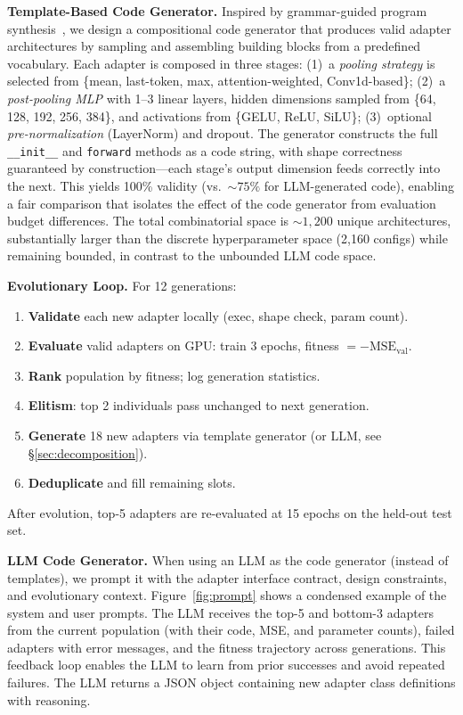 \documentclass{article}
\begin{document}
\textbf{Template-Based Code Generator.} Inspired by grammar-guided program synthesis~\cite{koza1994genetic, mckay2010grammar}, we design a compositional code generator that produces valid adapter architectures by sampling and assembling building blocks from a predefined vocabulary. Each adapter is composed in three stages: (1)~a \textit{pooling strategy} is selected from \{mean, last-token, max, attention-weighted, Conv1d-based\}; (2)~a \textit{post-pooling MLP} with 1--3 linear layers, hidden dimensions sampled from \{64, 128, 192, 256, 384\}, and activations from \{GELU, ReLU, SiLU\}; (3)~optional \textit{pre-normalization} (LayerNorm) and dropout. The generator constructs the full \texttt{\_\_init\_\_} and \texttt{forward} methods as a code string, with shape correctness guaranteed by construction---each stage's output dimension feeds correctly into the next. This yields 100\% validity (vs.\ ${\sim}75\%$ for LLM-generated code), enabling a fair comparison that isolates the effect of the code generator from evaluation budget differences. The total combinatorial space is ${\sim}1{,}200$ unique architectures, substantially larger than the discrete hyperparameter space (2,160 configs) while remaining bounded, in contrast to the unbounded LLM code space.

\textbf{Evolutionary Loop.} For 12 generations:
\begin{enumerate}
    \item \textbf{Validate} each new adapter locally (exec, shape check, param count).
    \item \textbf{Evaluate} valid adapters on GPU: train 3 epochs, fitness $= -\text{MSE}_\text{val}$.
    \item \textbf{Rank} population by fitness; log generation statistics.
    \item \textbf{Elitism}: top 2 individuals pass unchanged to next generation.
    \item \textbf{Generate} 18 new adapters via template generator (or LLM, see \S\ref{sec:decomposition}).
    \item \textbf{Deduplicate} and fill remaining slots.
\end{enumerate}
After evolution, top-5 adapters are re-evaluated at 15 epochs on the held-out test set.

\textbf{LLM Code Generator.} When using an LLM as the code generator (instead of templates), we prompt it with the adapter interface contract, design constraints, and evolutionary context. Figure~\ref{fig:prompt} shows a condensed example of the system and user prompts. The LLM receives the top-5 and bottom-3 adapters from the current population (with their code, MSE, and parameter counts), failed adapters with error messages, and the fitness trajectory across generations. This feedback loop enables the LLM to learn from prior successes and avoid repeated failures. The LLM returns a JSON object containing new adapter class definitions with reasoning.
\end{document}
